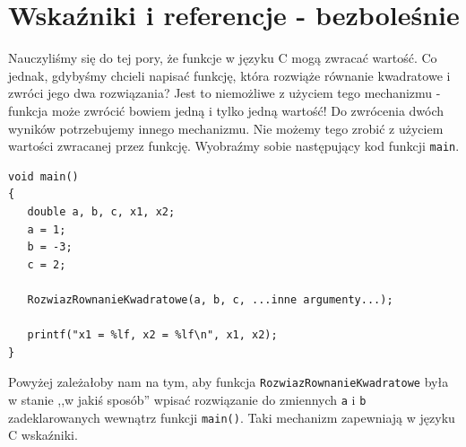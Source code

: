 \documentclass{instrukcja}
\begin{document}
\author{B. Górecki}
\materialtitle


\section{Wskaźniki i referencje - bezboleśnie}
Nauczyliśmy się do tej pory, że funkcje w języku C mogą zwracać wartość. Co jednak, gdybyśmy chcieli napisać funkcję, która rozwiąże równanie kwadratowe i zwróci jego dwa rozwiązania? Jest to niemożliwe z użyciem tego mechanizmu - funkcja może zwrócić bowiem jedną i tylko jedną wartość! Do zwrócenia dwóch wyników potrzebujemy innego mechanizmu. Nie możemy tego zrobić z użyciem wartości zwracanej przez funkcję. Wyobraźmy sobie następujący kod funkcji {\tt main}.
\begin{verbatim}
void main()
{
   double a, b, c, x1, x2;
   a = 1;
   b = -3;
   c = 2;

   RozwiazRownanieKwadratowe(a, b, c, ...inne argumenty...);

   printf("x1 = %lf, x2 = %lf\n", x1, x2);
}
\end{verbatim}
Powyżej zależałoby nam na tym, aby funkcja {\tt RozwiazRownanieKwadratowe} była w stanie ,,w jakiś sposób'' wpisać rozwiązanie do zmiennych {\tt a} i {\tt b} zadeklarowanych wewnątrz funkcji {\tt main()}. Taki mechanizm zapewniają w języku C wskaźniki.
\end{document}
